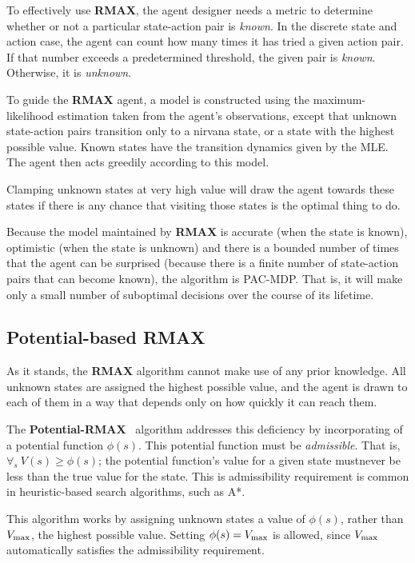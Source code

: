 To effectively use {\bf RMAX}, the agent designer needs a metric to determine whether or not a particular state-action pair is \emph{known}. In the discrete state and action case, the agent can count how many times it has tried a given action pair. If that number exceeds a predetermined threshold, the given pair is \emph{known}. Otherwise, it is \emph{unknown}.

To guide the {\bf RMAX} agent, a model is constructed using the maximum-likelihood estimation taken from the agent's observations, except that unknown state-action pairs transition only to a nirvana state, or a state with the highest possible value. Known states have the transition dynamics given by the MLE. The agent then acts greedily according to this model.

Clamping unknown states at very high value will draw the agent towards these states if there is any chance that visiting those states is the optimal thing to do.

Because the model maintained by {\bf RMAX} is accurate (when the state is known), optimistic (when the state is unknown) and there is a bounded number of times that the agent can be surprised (because there is a finite number of state-action pairs that can become known), the algorithm is PAC-MDP. That is, it will make only a small number of suboptimal decisions over the course of its lifetime.

\subsection{Potential-based RMAX}

As it stands, the {\bf RMAX} algorithm cannot make use of any prior knowledge. All unknown states are assigned the highest possible value, and the agent is drawn to each of them in a way that depends only on how quickly it can reach them.

The {\bf Potential-RMAX}~\cite{asmuth08} algorithm addresses this deficiency by incorporating of a potential function $\phi(s)$. This potential function must be \emph{admissible}. That is, $\forall_s ~ V(s) \geq \phi(s)$; the potential function's value for a given state mustnever be less than the true value for the state. This is admissibility requirement is common in heuristic-based search algorithms, such as A*.

This algorithm works by assigning unknown states a value of $\phi(s)$, rather than $V_{\rm max}$, the highest possible value. Setting $\phi(s)=V_{\rm max}$ is allowed, since $V_{\rm max}$ automatically satisfies the admissibility requirement.

